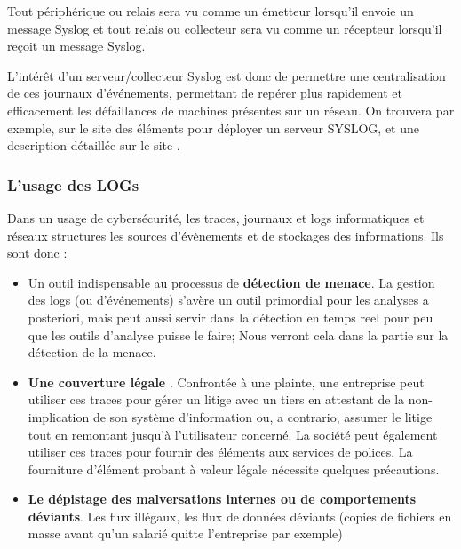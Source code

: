 Tout périphérique ou relais sera vu comme un émetteur lorsqu'il envoie un message Syslog et tout relais ou collecteur sera vu comme un récepteur lorsqu'il reçoit un message Syslog.

L'intérêt d'un serveur/collecteur Syslog est donc de permettre une centralisation de ces journaux d'événements, permettant de repérer plus rapidement et efficacement les défaillances de machines présentes sur un réseau. On trouvera par exemple, sur le site 
 des éléments pour déployer un serveur SYSLOG, et une description détaillée sur le site .

 \subsubsection{L'usage des LOGs}
 
 
 Dans un usage de cybersécurité, les traces, journaux et logs informatiques et réseaux structures les sources d'évènements et de stockages des informations. Ils sont donc :
 
 \begin{itemize}

   \item Un outil indispensable au processus de \textbf{détection de menace}. La gestion des logs (ou d’événements) s’avère un outil primordial pour les analyses a posteriori, mais peut aussi servir dans la détection en temps reel pour peu que les outils d'analyse puisse le faire; Nous verront cela dans la partie sur la détection de la menace.

   \item  \textbf{Une couverture légale }. Confrontée à une plainte, une entreprise peut utiliser ces traces pour gérer un litige avec un tiers  en attestant de la non-implication de son système d’information ou, a contrario, assumer le litige tout en remontant jusqu’à l’utilisateur concerné. La société peut également utiliser ces traces pour fournir des éléments aux services de polices. La fourniture d'élément probant à valeur légale nécessite quelques précautions. 

   \item  \textbf{Le dépistage des malversations internes ou de comportements déviants}. Les flux illégaux, les flux de données déviants (copies de fichiers en masse avant qu'un salarié quitte l'entreprise par exemple)

\end{itemize}

